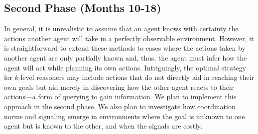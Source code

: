 \documentclass[12pt]{article}
\begin{document}



\subsection*{Second Phase (Months  10-18)}


In general, it is unrealistic to assume that an agent knows with
certainty the actions another agent will take in a perfectly
observable environment. However, it is straightforward to extend these
methods to cases where the actions taken by another agent are only
partially known and, thus, the agent must infer how the agent will act
while planning its own actions. Intriguingly, the optimal strategy for
$k$-level reasoners may include actions that do not directly aid in
reaching their own goals but aid merely in discovering how the other
agent reacts to their actions---a form of querying to gain information.
We plan to implement this approach in the second phase. We also plan
to investigate how coordination norms and signaling emerge in
environments where the goal is unknown to one agent but is known to
the other, and when the signals are costly.

\end{document}
